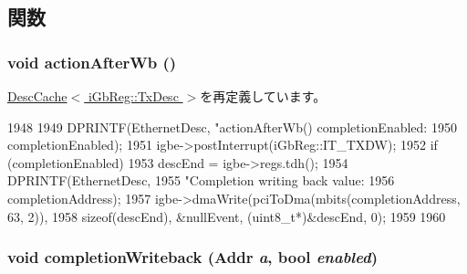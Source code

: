\subsection{関数}
\hypertarget{classIGbE_1_1TxDescCache_a32bbafeff677d291df2eb9247a33b292}{
\subsubsection[{actionAfterWb}]{\setlength{\rightskip}{0pt plus 5cm}void actionAfterWb ()}}
\label{classIGbE_1_1TxDescCache_a32bbafeff677d291df2eb9247a33b292}


\hyperlink{classIGbE_1_1DescCache_a22d736f39e553f2f93799dc2e0eea912}{DescCache$<$ iGbReg::TxDesc $>$}を再定義しています。


\begin{DoxyCode}
1948 {
1949     DPRINTF(EthernetDesc, "actionAfterWb() completionEnabled: %
1950             completionEnabled);
1951     igbe->postInterrupt(iGbReg::IT_TXDW);
1952     if (completionEnabled) { 
1953         descEnd = igbe->regs.tdh();
1954         DPRINTF(EthernetDesc,
1955                 "Completion writing back value: %
1956                 completionAddress);
1957         igbe->dmaWrite(pciToDma(mbits(completionAddress, 63, 2)),
1958                        sizeof(descEnd), &nullEvent, (uint8_t*)&descEnd, 0);
1959     }
1960 }
\end{DoxyCode}
\hypertarget{classIGbE_1_1TxDescCache_a10c4245eaf8149b42c17bb6aa4a7c5eb}{
\subsubsection[{completionWriteback}]{\setlength{\rightskip}{0pt plus 5cm}void completionWriteback ({\bf Addr} {\em a}, \/  bool {\em enabled})}}
\label{classIGbE_1_1TxDescCache_a10c4245eaf8149b42c17bb6aa4a7c5eb}



